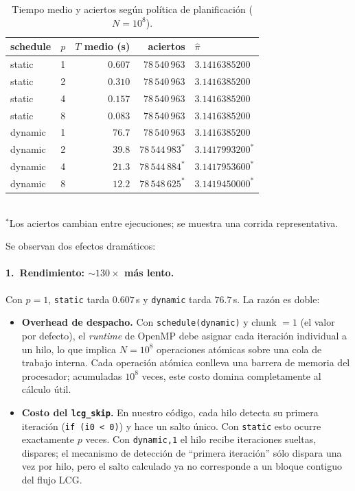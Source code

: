 \documentclass[12pt,a4paper]{article}
\begin{document}
\begin{table}[ht]
  \centering
  \caption{Tiempo medio y aciertos seg\'un pol\'itica de planificaci\'on ($N=10^8$).}
  \label{tab:sched}
  \begin{tabular}{llrrl}
    \toprule
    schedule & $p$ & $T$ medio (s) & aciertos & $\hat\pi$ \\
    \midrule
    static  & 1 & $0.607$  & $78\,540\,963$ & $3.1416385200$ \\
    static  & 2 & $0.310$  & $78\,540\,963$ & $3.1416385200$ \\
    static  & 4 & $0.157$  & $78\,540\,963$ & $3.1416385200$ \\
    static  & 8 & $0.083$  & $78\,540\,963$ & $3.1416385200$ \\
    \midrule
    dynamic & 1 & $76.7$   & $78\,540\,963$ & $3.1416385200$ \\
    dynamic & 2 & $39.8$   & $78\,544\,983^*$ & $3.1417993200^*$ \\
    dynamic & 4 & $21.3$   & $78\,544\,884^*$ & $3.1417953600^*$ \\
    dynamic & 8 & $12.2$   & $78\,548\,625^*$ & $3.1419450000^*$ \\
    \bottomrule
  \end{tabular}\\[4pt]
  \footnotesize $^*$Los aciertos cambian entre ejecuciones; se muestra una corrida representativa.
\end{table}

Se observan dos efectos dram\'aticos:

\paragraph{1.\ Rendimiento: ${\sim}130\times$ m\'as lento.}
Con $p=1$, \texttt{static} tarda $0.607$\,s y \texttt{dynamic} tarda $76.7$\,s. La raz\'on es doble:
\begin{itemize}
  \item \textbf{Overhead de despacho.} Con \texttt{schedule(dynamic)} y chunk $=1$ (el valor por defecto), el \emph{runtime} de OpenMP debe asignar cada iteraci\'on individual a un hilo, lo que implica $N=10^8$ operaciones at\'omicas sobre una cola de trabajo interna. Cada operaci\'on at\'omica conlleva una barrera de memoria del procesador; acumuladas $10^8$ veces, este costo domina completamente al c\'alculo \'util.
  \item \textbf{Costo del \texttt{lcg\_skip}.} En nuestro c\'odigo, cada hilo detecta su primera iteraci\'on (\texttt{if (i0 < 0)}) y hace un salto \'unico. Con \texttt{static} esto ocurre exactamente $p$ veces. Con \texttt{dynamic,1} el hilo recibe iteraciones sueltas, dispares; el mecanismo de detecci\'on de ``primera iteraci\'on'' s\'olo dispara una vez por hilo, pero el salto calculado ya no corresponde a un bloque contiguo del flujo LCG.
\end{itemize}
\end{document}
